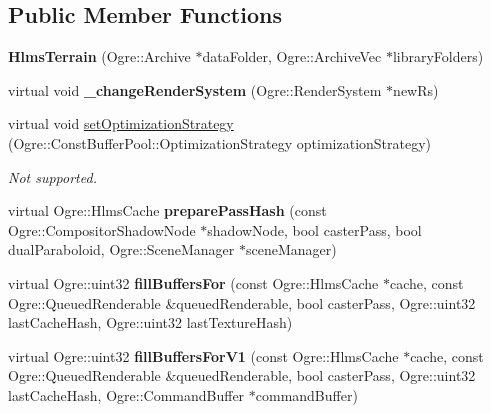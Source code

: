 \subsection*{Public Member Functions}
\begin{DoxyCompactItemize}
\item 
\mbox{\label{class_hlms_terrain_ab39e90b1829b06e962e852991554768f}} 
{\bfseries Hlms\+Terrain} (Ogre\+::\+Archive $\ast$data\+Folder, Ogre\+::\+Archive\+Vec $\ast$library\+Folders)
\item 
\mbox{\label{class_hlms_terrain_a5ee80708dd984edecb9dcefa8d64ce7f}} 
virtual void {\bfseries \+\_\+change\+Render\+System} (Ogre\+::\+Render\+System $\ast$new\+Rs)
\item 
\mbox{\label{class_hlms_terrain_ac533a5af538cbb484ece7942634a2e1d}} 
virtual void \hyperlink{class_hlms_terrain_ac533a5af538cbb484ece7942634a2e1d}{set\+Optimization\+Strategy} (Ogre\+::\+Const\+Buffer\+Pool\+::\+Optimization\+Strategy optimization\+Strategy)
\begin{DoxyCompactList}\small\item\em Not supported. \end{DoxyCompactList}\item 
\mbox{\label{class_hlms_terrain_a028d73bf95de789a269643c7dbb131d6}} 
virtual Ogre\+::\+Hlms\+Cache {\bfseries prepare\+Pass\+Hash} (const Ogre\+::\+Compositor\+Shadow\+Node $\ast$shadow\+Node, bool caster\+Pass, bool dual\+Paraboloid, Ogre\+::\+Scene\+Manager $\ast$scene\+Manager)
\item 
\mbox{\label{class_hlms_terrain_aee7595282d4810e43f1fba0b588107f7}} 
virtual Ogre\+::uint32 {\bfseries fill\+Buffers\+For} (const Ogre\+::\+Hlms\+Cache $\ast$cache, const Ogre\+::\+Queued\+Renderable \&queued\+Renderable, bool caster\+Pass, Ogre\+::uint32 last\+Cache\+Hash, Ogre\+::uint32 last\+Texture\+Hash)
\item 
\mbox{\label{class_hlms_terrain_aed0aae1ffae857ec9a0bc126c707c635}} 
virtual Ogre\+::uint32 {\bfseries fill\+Buffers\+For\+V1} (const Ogre\+::\+Hlms\+Cache $\ast$cache, const Ogre\+::\+Queued\+Renderable \&queued\+Renderable, bool caster\+Pass, Ogre\+::uint32 last\+Cache\+Hash, Ogre\+::\+Command\+Buffer $\ast$command\+Buffer)

\end{DoxyCompactItemize}
